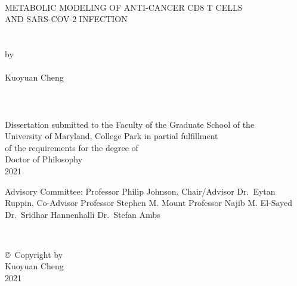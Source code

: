 \documentclass[12pt,twoside,openany,\mydriver]{thesis}  %
\renewcommand{\baselinestretch}{2}
\begin{document}
\begin{titlepage1}
    \thispagestyle{empty} \hbox{\ } \vspace{1in}
    
    \renewcommand{\baselinestretch}{1}
    
    \small\normalsize 
    \begin{center}
    \large{{METABOLIC MODELING OF ANTI-CANCER CD8 T CELLS\\ AND SARS-COV-2 INFECTION}}\\ \ \\ \ \\ \large{by} \\ \ \\ \large{Kuoyuan Cheng} \ \\ \ \\ \ \\ \ \\ \normalsize Dissertation submitted to the Faculty of the Graduate School of the \\ University of Maryland, College Park in partial fulfillment \\ of the requirements for the degree of \\ Doctor of Philosophy \\ 2021 \end{center}
    \vspace{7.5em}
    
    \noindent Advisory Committee: \newline \indent Professor Philip Johnson, Chair/Advisor \newline \indent Dr.~Eytan Ruppin, Co-Advisor \newline \indent Professor Stephen M. Mount \newline \indent Professor Najib M. El-Sayed \newline \indent Dr.~Sridhar Hannenhalli \newline \indent Dr.~Stefan Ambs
\end{titlepage1}
\begin{copyright1}
    \thispagestyle{empty} \hbox{\ }
    \vfill 
    
    \renewcommand{\baselinestretch}{1} \small\normalsize
    \vspace{.5in}
    \begin{center} \large{\copyright \hbox{ }Copyright by\\ Kuoyuan Cheng \\ 2021} \end{center}
    \vfill
    \newpage
\end{copyright1}
\pagestyle{plain}  \setcounter{page}{2}
\end{document}
